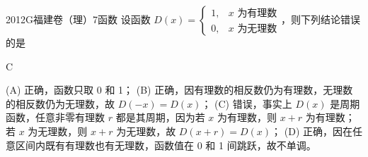 
\begin{problem}{2012}{G}{福建卷（理）}{7}{函数}
设函数 $D(x) = \begin{cases} 1, & x \text{ 为有理数} \\ 0, & x\text{ 为无理数} \end{cases} $，则下列结论错误的是
\begin{choices}
\end{choices}
\end{problem}

\begin{answer}
C
\end{answer}

\begin{solutions}
(A) 正确，函数只取 0 和 1；  
(B) 正确，因有理数的相反数仍为有理数，无理数的相反数仍为无理数，故 $ D(-x) = D(x) $；  
(C) 错误，事实上 $ D(x) $ 是周期函数，任意非零有理数 $ r $ 都是其周期，因为若 $ x $ 为有理数，则 $ x + r $ 为有理数；若 $ x $ 为无理数，则 $ x + r $ 为无理数，故 $ D(x + r) = D(x) $；  
(D) 正确，因在任意区间内既有有理数也有无理数，函数值在 0 和 1 间跳跃，故不单调。
\end{solutions}